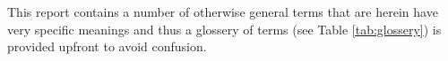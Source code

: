 This report contains a number of otherwise general terms that are herein have very specific meanings
and thus a glossery of terms (see Table \ref{tab:glossery}) is provided upfront to avoid confusion.



